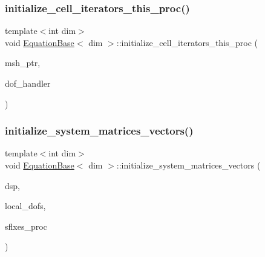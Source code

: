 \subsubsection{\texorpdfstring{initialize\+\_\+cell\+\_\+iterators\+\_\+this\+\_\+proc()}{initialize\_cell\_iterators\_this\_proc()}}
{\footnotesize\ttfamily template$<$int dim$>$ \\
void \hyperlink{class_equation_base}{Equation\+Base}$<$ dim $>$\+::initialize\+\_\+cell\+\_\+iterators\+\_\+this\+\_\+proc (\begin{DoxyParamCaption}\item[{const std\+\_\+cxx11\+::shared\+\_\+ptr$<$ \hyperlink{class_mesh_generator}{Mesh\+Generator}$<$ dim $>$ $>$}]{msh\+\_\+ptr,  }\item[{const Do\+F\+Handler$<$ dim $>$ \&}]{dof\+\_\+handler }\end{DoxyParamCaption})}

\mbox{\label{class_equation_base_a25ff3b8e1a0c98dc5077e6afbac6606c}} 
\subsubsection{\texorpdfstring{initialize\+\_\+system\+\_\+matrices\+\_\+vectors()}{initialize\_system\_matrices\_vectors()}}
{\footnotesize\ttfamily template$<$int dim$>$ \\
void \hyperlink{class_equation_base}{Equation\+Base}$<$ dim $>$\+::initialize\+\_\+system\+\_\+matrices\+\_\+vectors (\begin{DoxyParamCaption}\item[{Dynamic\+Sparsity\+Pattern \&}]{dsp,  }\item[{Index\+Set \&}]{local\+\_\+dofs,  }\item[{std\+::vector$<$ Vector$<$ double $>$ $>$ \&}]{sflxes\+\_\+proc }\end{DoxyParamCaption})\hspace{0.3cm}{\ttfamily [virtual]}}

\mbox{\label{class_equation_base_ae294806284f671619cac9e7169ffff8d}} 

